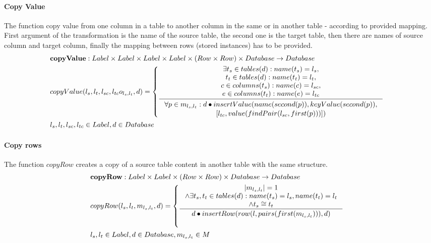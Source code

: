 \documentclass[11pt]{article}
\begin{document}
\paragraph{Copy Value} The function copy value from one column in a table to another column in the same or in another table - according to provided mapping. First argument of the transformation is the name of the source table, the second one is the target table, then there are names of source column and target column, finally the mapping between rows (stored instances) has to be provided.
\begin{align*}
&	\mathbf{copyValue} : Label \times Label \times Label \times Label \times (Row \times Row) \times Database \rightarrow Database \\
&	copyValue(l_s, l_t, l_{sc}, l_{tc} o_{l_s, l_t}, d) = \begin{cases}
		\inference{\exists t_s \in tables(d) : name(t_s) = l_s, \\ t_t \in tables(d) : name(t_t) = l_t, \\ c \in columns(t_s) : name(c) = l_{sc}, \\ e \in columns(t_t) : name(e) = l_{tc}}{\begin{gathered}
		\forall	p \in m_{l_s, l_t} :	d \bullet insertValue(name(second(p)), keyValue(second(p)), \\ [l_{tc},value(findPair(l_{sc}, first(p)))])
		\end{gathered}}
 	\end{cases} \\
& 	l_s, l_t, l_{sc}, l_{tc} \in Label, d \in Database
\end{align*}

\paragraph{Copy rows} The function $copyRow$ creates a copy of a source table content in another table with the same structure. 
\begin{align*}
&	\mathbf{copyRow} : Label \times Label \times (Row \times Row) \times Database \rightarrow Database \\
&	copyRow(l_s, l_t, m_{l_s, l_t}, d) = \begin{cases}
 	\inference{|m_{l_s, l_t}| = 1 \\ \wedge \exists t_s, t_t \in tables(d) : name(t_s) = l_s, name(t_t) = l_t \\ \wedge t_s \cong t_t }{d \bullet insertRow(row(l, pairs(first(m_{l_s, l_t}))), d)} \\\\
  \end{cases} \\
&  l_s, l_t \in Label, d \in Database, m_{l_s, l_t} \in M
\end{align*}
\end{document}
